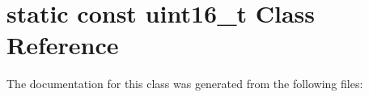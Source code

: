 \hypertarget{classstatic_01const_01uint16__t}{}\section{static const uint16\+\_\+t Class Reference}
\label{classstatic_01const_01uint16__t}


The documentation for this class was generated from the following files\+: